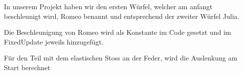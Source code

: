 \documentclass[../main.tex]{subfiles}
\begin{document}
In unserem Projekt haben wir den ersten Würfel, welcher am anfangt beschleunigt wird, Romeo benannt und entsprechend der zweiter Würfel Julia.

Die Beschleunigung von Romeo wird als Konstante im Code gesetzt und im FixedUpdate jeweils hinzugefügt.


Für den Teil mit dem elastischen Stoss an der Feder, wird die Auslenkung am Start berechnet 
\end{document}
